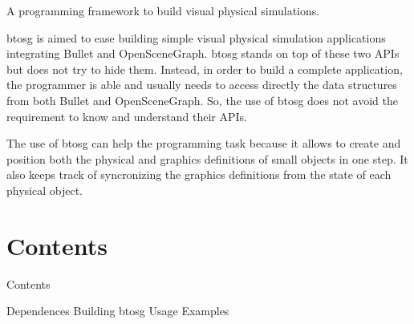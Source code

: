 A programming framework to build visual physical simulations.

btosg is aimed to ease building simple visual physical simulation applications integrating Bullet and Open\+Scene\+Graph. btosg stands on top of these two A\+P\+Is but does not try to hide them. Instead, in order to build a complete application, the programmer is able and usually needs to access directly the data structures from both Bullet and Open\+Scene\+Graph. So, the use of btosg does not avoid the requirement to know and understand their A\+P\+Is.

The use of btosg can help the programming task because it allows to create and position both the physical and graphics definitions of small objects in one step. It also keeps track of syncronizing the graphics definitions from the state of each physical object.\hypertarget{index_contents}{}\section{Contents}\label{index_contents}
Contents

Dependences Building btosg Usage Examples

